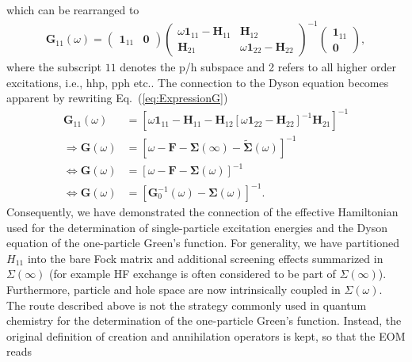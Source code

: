 \documentclass[aip,jcp,reprint,noshowkeys,superscriptaddress]{revtex4-2}
\begin{document}
which can be rearranged to 
\begin{align}
    \mathbf{G}_{11}(\omega)  = 
    \begin{pmatrix}
        \mathbf{1}_{11} & \mathbf{0} 
    \end{pmatrix}
    \begin{pmatrix}
        \omega\mathbf{1}_{11} - \mathbf{H}_{11} & \mathbf{H}_{12} \\
        \mathbf{H}_{21} & \omega\mathbf{1}_{22} - \mathbf{H}_{22} 
    \end{pmatrix}^{-1}
    \begin{pmatrix}
        \mathbf{1}_{11} \\
        \mathbf{0}
    \end{pmatrix},
    \label{eq:ExpressionG}
\end{align}
where the subscript $11$ denotes the p/h subspace and 2 refers to all higher order excitations, i.e., hhp, pph etc..
The connection to the Dyson equation becomes apparent by rewriting Eq.~(\ref{eq:ExpressionG})
\begin{align}
    \mathbf{G}_{11}(\omega) \nonumber &= \left[\omega\mathbf{1}_{11} - \mathbf{H}_{11} - \mathbf{H}_{12}[\omega\mathbf{1}_{22} - \mathbf{H}_{22}]^{-1}\mathbf{H}_{21}\right]^{-1} \\
    \Rightarrow \mathbf{G}(\omega) \nonumber &= \left[\omega - \mathbf{F} - \pmb{\Sigma}(\infty ) - \tilde{\pmb{\Sigma}}(\omega) \right]^{-1}\\
    \Leftrightarrow \mathbf{G}(\omega) \nonumber &= \left[\omega - \mathbf{F} - \pmb{\Sigma}(\omega) \right]^{-1} \nonumber \\
    \Leftrightarrow \mathbf{G}(\omega)  &= \left[\mathbf{G}^{-1}_0(\omega) - \pmb{\Sigma}(\omega) \right]^{-1}.
\end{align}
Consequently, we have demonstrated the connection of the effective Hamiltonian used for the determination of single-particle excitation energies and the Dyson equation of the one-particle Green's function.
For generality, we have partitioned $H_{11}$ into the bare Fock matrix and additional screening effects summarized in $\Sigma(\infty)$ (for example HF exchange is often considered to be part of $\Sigma(\infty)$). Furthermore, particle and hole space are now intrinsically coupled in $\Sigma(\omega)$.
\\
The route described above is not the strategy commonly used in quantum chemistry for the determination of the one-particle Green's function.
Instead, the original definition of creation and annihilation operators is kept, so that the EOM reads 
\end{document}
